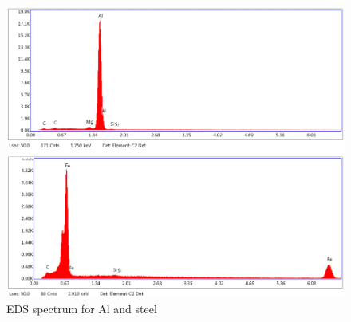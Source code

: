 \documentclass{article}
\begin{document}
\begin{figure}[h]
	\centering
	\includegraphics[scale=0.9]{2cEDS.png}
	\caption{EDS spectrum for Al and steel}
\end{figure}
\end{document}
